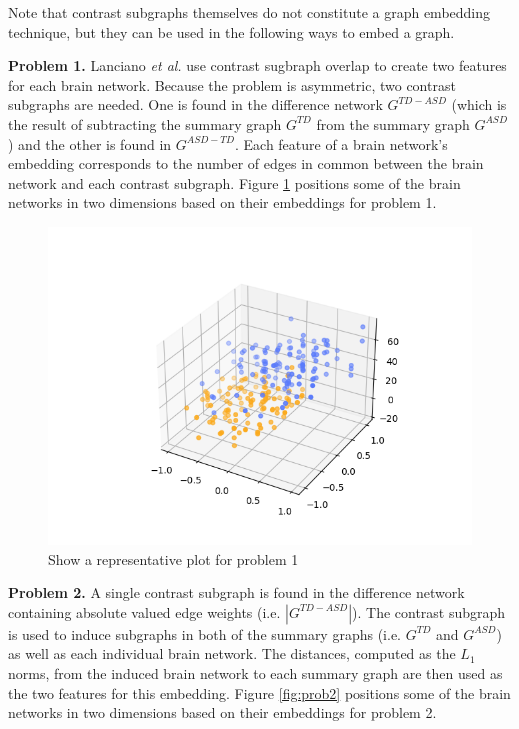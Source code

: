 \documentclass[letterpaper]{article}
\begin{document}
Note that contrast subgraphs themselves do not constitute a graph embedding technique, but they can be used in the following ways to embed a graph.

\textbf{Problem 1.}
Lanciano \emph{et al.} use contrast sugbraph overlap to create two features for each brain network.
Because the problem is asymmetric, two contrast subgraphs are needed.
One is found in the difference network $G^{TD - ASD}$ (which is the result of subtracting the summary graph $G^{TD}$ from the summary graph $G^{ASD}$) and the other is found in $G^{ASD - TD}$.
Each feature of a brain network's embedding corresponds to the number of edges in common between the brain network and each contrast subgraph.
Figure \ref{fig:prob1} positions some of the brain networks in two dimensions based on their embeddings for problem 1. 

\begin{figure}
    \centering
    \includegraphics[width=\columnwidth, keepaspectratio=true]{test.png}
    \caption{Show a representative plot for problem 1}
    \label{fig:prob1}
\end{figure}

\textbf{Problem 2.}
A single contrast subgraph is found in the difference network containing absolute valued edge weights (i.e. $|G^{TD - ASD}|$).
The contrast subgraph is used to induce subgraphs in both of the summary graphs (i.e. $G^{TD}$ and $G^{ASD}$) as well as each individual brain network.
The distances, computed as the $L_1$ norms, from the induced brain network to each summary graph are then used as the two features for this embedding.
Figure \ref{fig:prob2} positions some of the brain networks in two dimensions based on their embeddings for problem 2. 
\end{document}
